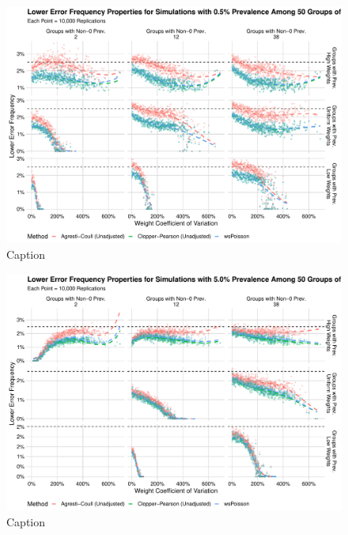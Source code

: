 \documentclass[AMA,STIX1COL]{WileyNJD-v2}
\begin{document}
\begin{figure}
    \centering
    \includegraphics[width=\textwidth]{figures/perfect_lower_error_frequency_50_0_005_reduced.pdf}
    \caption{Caption}
    \label{fig:perfect_lower_error_frequency_50_0_005_reduced}
\end{figure}


\begin{figure}
    \centering
    \includegraphics[width=\textwidth]{figures/perfect_lower_error_frequency_50_0_05_reduced.pdf}
    \caption{Caption}
    \label{fig:perfect_lower_error_frequency_50_0_05_reduced}
\end{figure}
\end{document}
